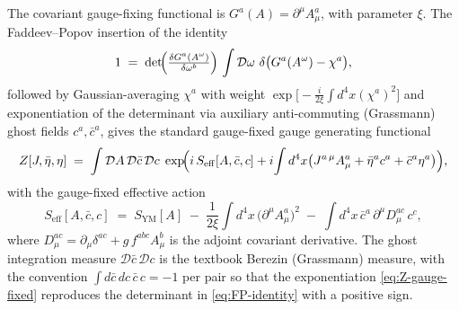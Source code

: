 The covariant gauge-fixing functional is
$G^{a}(A) = \partial^{\mu}A^{a}_{\mu}$, with parameter $\xi$. The
Faddeev--Popov \cite{FaddeevPopov1967} insertion of the identity
\begin{equation}\label{eq:FP-identity}
  1 \;=\;
  \det\!\Bigl(\tfrac{\delta G^{a}(A^{\omega})}{\delta \omega^{b}}\Bigr)
  \,\int \mathcal{D}\omega\ \delta\bigl(G^{a}(A^{\omega}) - \chi^{a}\bigr),
\end{equation}
followed by Gaussian-averaging $\chi^{a}$ with weight
$\exp\!\bigl[-\tfrac{i}{2\xi}\!\int d^4x (\chi^a)^2\bigr]$ and
exponentiation of the determinant via auxiliary anti-commuting
(Grassmann) ghost fields $c^{a},\bar c^{a}$, gives the standard
gauge-fixed gauge generating functional
\begin{equation}\label{eq:Z-gauge-fixed}
  Z[J,\bar\eta,\eta]
  \;=\;
  \int \mathcal{D}A\,\mathcal{D}\bar c\,\mathcal{D}c\;
  \exp\!\Bigl(
    i\,S_{\mathrm{eff}}[A,\bar c,c]
    + i\!\int d^4x\bigl(J^{a\,\mu}A^{a}_{\mu}
       + \bar\eta^{a} c^{a} + \bar c^{a}\eta^{a}\bigr)
  \Bigr),
\end{equation}
with the gauge-fixed effective action
\begin{equation}\label{eq:Seff}
  S_{\mathrm{eff}}[A,\bar c,c]
  \;=\;
  S_{\mathrm{YM}}[A]
  \;-\;\frac{1}{2\xi}\!\int d^4x\,\bigl(\partial^{\mu}A^{a}_{\mu}\bigr)^{2}
  \;-\;\!\int d^4x\,\bar c^{a}\,\partial^{\mu}D_{\mu}^{ac}\,c^{c},
\end{equation}
where $D_{\mu}^{ac} = \partial_{\mu}\delta^{ac} + g\,f^{abc}A^{b}_{\mu}$
is the adjoint covariant derivative. The ghost integration measure
$\mathcal{D}\bar c\,\mathcal{D}c$ is the textbook Berezin (Grassmann)
measure, with the convention
$\int d\bar c\,dc\,\bar c\,c = -1$ per pair so that the
exponentiation \eqref{eq:Z-gauge-fixed} reproduces the determinant in
\eqref{eq:FP-identity} with a positive sign.

